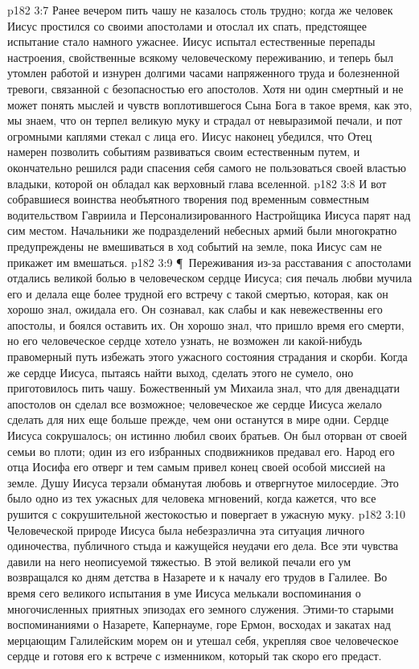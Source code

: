 \vs p182 3:7 Ранее вечером пить чашу не казалось столь трудно; когда же человек Иисус простился со своими апостолами и отослал их спать, предстоящее испытание стало намного ужаснее. Иисус испытал естественные перепады настроения, свойственные всякому человеческому переживанию, и теперь был утомлен работой и изнурен долгими часами напряженного труда и болезненной тревоги, связанной с безопасностью его апостолов. Хотя ни один смертный и не может понять мыслей и чувств воплотившегося Сына Бога в такое время, как это, мы знаем, что он терпел великую муку и страдал от невыразимой печали, и пот огромными каплями стекал с лица его. Иисус наконец убедился, что Отец намерен позволить событиям развиваться своим естественным путем, и окончательно решился ради спасения себя самого не пользоваться своей властью владыки, которой он обладал как верховный глава вселенной.
\vs p182 3:8 И вот собравшиеся воинства необъятного творения под временным совместным водительством Гавриила и Персонализированного Настройщика Иисуса парят над сим местом. Начальники же подразделений небесных армий были многократно предупреждены не вмешиваться в ход событий на земле, пока Иисус сам не прикажет им вмешаться.
\vs p182 3:9 \P\ Переживания из\hyp{}за расставания с апостолами отдались великой болью в человеческом сердце Иисуса; сия печаль любви мучила его и делала еще более трудной его встречу с такой смертью, которая, как он хорошо знал, ожидала его. Он сознавал, как слабы и как невежественны его апостолы, и боялся оставить их. Он хорошо знал, что пришло время его смерти, но его человеческое сердце хотело узнать, не возможен ли какой\hyp{}нибудь правомерный путь избежать этого ужасного состояния страдания и скорби. Когда же сердце Иисуса, пытаясь найти выход, сделать этого не сумело, оно приготовилось пить чашу. Божественный ум Михаила знал, что для двенадцати апостолов он сделал все возможное; человеческое же сердце Иисуса желало сделать для них еще больше прежде, чем они останутся в мире одни. Сердце Иисуса сокрушалось; он истинно любил своих братьев. Он был оторван от своей семьи во плоти; один из его избранных сподвижников предавал его. Народ его отца Иосифа его отверг и тем самым привел конец своей особой миссией на земле. Душу Иисуса терзали обманутая любовь и отвергнутое милосердие. Это было одно из тех ужасных для человека мгновений, когда кажется, что все рушится с сокрушительной жестокостью и повергает в ужасную муку.
\vs p182 3:10 Человеческой природе Иисуса была небезразлична эта ситуация личного одиночества, публичного стыда и кажущейся неудачи его дела. Все эти чувства давили на него неописуемой тяжестью. В этой великой печали его ум возвращался ко дням детства в Назарете и к началу его трудов в Галилее. Во время сего великого испытания в уме Иисуса мелькали воспоминания о многочисленных приятных эпизодах его земного служения. Этими\hyp{}то старыми воспоминаниями о Назарете, Капернауме, горе Ермон, восходах и закатах над мерцающим Галилейским морем он и утешал себя, укрепляя свое человеческое сердце и готовя его к встрече с изменником, который так скоро его предаст.

